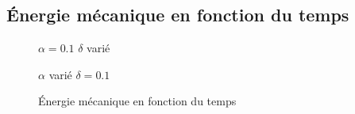 \documentclass{article}
\begin{document}
\subsection{Énergie mécanique en fonction du temps}
\begin{figure}[h]
	\begin{minipage}[h]{0.49\linewidth}
		{$\alpha=0.1$ $\delta$ varié}
	\end{minipage}
	\hfill
	\begin{minipage}[h]{0.49\linewidth}
		{$\alpha$ varié $\delta=0.1$}
	\end{minipage}
	\caption{Énergie mécanique en fonction du temps}
\end{figure}
\end{document}
